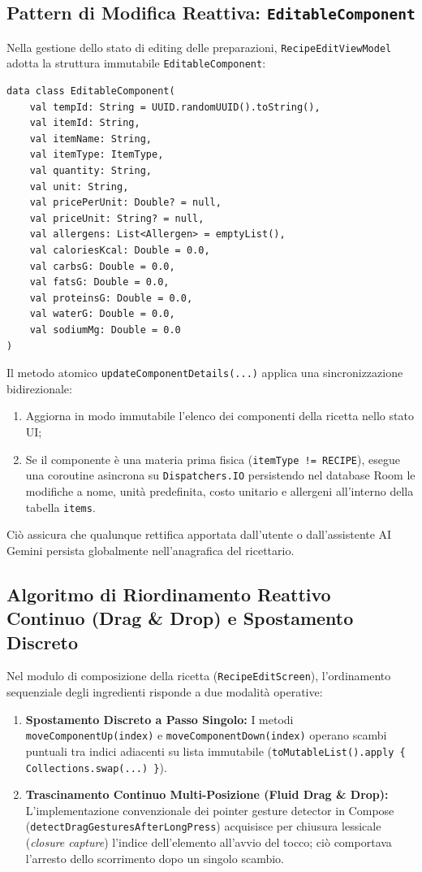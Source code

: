 \documentclass[11pt,a4paper,titlepage]{article}
\begin{document}
\subsection{Pattern di Modifica Reattiva: \texttt{EditableComponent}}
Nella gestione dello stato di editing delle preparazioni, \texttt{RecipeEditViewModel} adotta la struttura immutabile \texttt{EditableComponent}:
\begin{lstlisting}[caption={Data model reattivo per la modifica di ingredienti e materie prime}]
data class EditableComponent(
    val tempId: String = UUID.randomUUID().toString(),
    val itemId: String,
    val itemName: String,
    val itemType: ItemType,
    val quantity: String,
    val unit: String,
    val pricePerUnit: Double? = null,
    val priceUnit: String? = null,
    val allergens: List<Allergen> = emptyList(),
    val caloriesKcal: Double = 0.0,
    val carbsG: Double = 0.0,
    val fatsG: Double = 0.0,
    val proteinsG: Double = 0.0,
    val waterG: Double = 0.0,
    val sodiumMg: Double = 0.0
)
\end{lstlisting}
Il metodo atomico \texttt{updateComponentDetails(...)} applica una sincronizzazione bidirezionale:
\begin{enumerate}
    \item Aggiorna in modo immutabile l'elenco dei componenti della ricetta nello stato UI;
    \item Se il componente \`e una materia prima fisica (\texttt{itemType != RECIPE}), esegue una coroutine asincrona su \texttt{Dispatchers.IO} persistendo nel database Room le modifiche a nome, unit\`a predefinita, costo unitario e allergeni all'interno della tabella \texttt{items}.
\end{enumerate}
Ci\`o assicura che qualunque rettifica apportata dall'utente o dall'assistente AI Gemini persista globalmente nell'anagrafica del ricettario.

\subsection{Algoritmo di Riordinamento Reattivo Continuo (Drag \& Drop) e Spostamento Discreto}
Nel modulo di composizione della ricetta (\texttt{RecipeEditScreen}), l'ordinamento sequenziale degli ingredienti risponde a due modalit\`a operative:
\begin{enumerate}
    \item \textbf{Spostamento Discreto a Passo Singolo:} I metodi \texttt{moveComponentUp(index)} e \texttt{moveComponentDown(index)} operano scambi puntuali tra indici adiacenti su lista immutabile (\texttt{toMutableList().apply \{ Collections.swap(...) \}}).
    \item \textbf{Trascinamento Continuo Multi-Posizione (Fluid Drag \& Drop):} L'implementazione convenzionale dei pointer gesture detector in Compose (\texttt{detectDragGesturesAfterLongPress}) acquisisce per chiusura lessicale (\textit{closure capture}) l'indice dell'elemento all'avvio del tocco; ci\`o comportava l'arresto dello scorrimento dopo un singolo scambio.
\end{enumerate}
\end{document}
